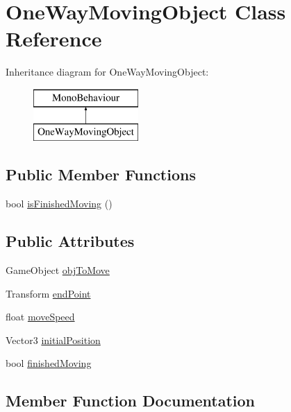 \hypertarget{class_one_way_moving_object}{}\section{One\+Way\+Moving\+Object Class Reference}
\label{class_one_way_moving_object}
Inheritance diagram for One\+Way\+Moving\+Object\+:\begin{figure}[H]
\begin{center}
\leavevmode
\includegraphics[height=2.000000cm]{class_one_way_moving_object}
\end{center}
\end{figure}
\subsection*{Public Member Functions}
\begin{DoxyCompactItemize}
\item 
bool \hyperlink{class_one_way_moving_object_a09d08513eaa584681898a1c13d33de1c}{is\+Finished\+Moving} ()
\end{DoxyCompactItemize}
\subsection*{Public Attributes}
\begin{DoxyCompactItemize}
\item 
Game\+Object \hyperlink{class_one_way_moving_object_a738199df4fd9102323b3031b91f27cee}{obj\+To\+Move}
\item 
Transform \hyperlink{class_one_way_moving_object_ada34abca5c152d343ca7ce4f8d526386}{end\+Point}
\item 
float \hyperlink{class_one_way_moving_object_a57d03a6a88136b9c0a2fb931d3753fbd}{move\+Speed}
\item 
Vector3 \hyperlink{class_one_way_moving_object_a3373e130216d4a6ef9f6ba38083aee8b}{initial\+Position}
\item 
bool \hyperlink{class_one_way_moving_object_aa188d5bd0f6dd799966acebc9088471f}{finished\+Moving}
\end{DoxyCompactItemize}


\subsection{Member Function Documentation}
\mbox{\label{class_one_way_moving_object_a09d08513eaa584681898a1c13d33de1c}} 
